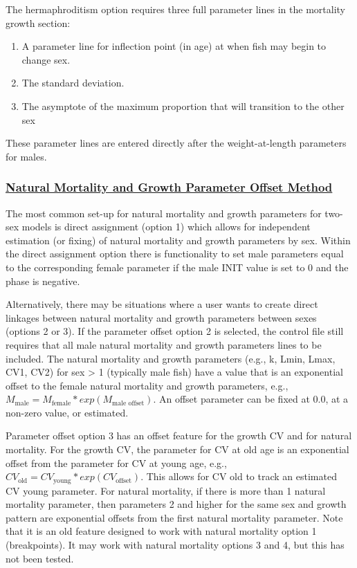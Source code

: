 The hermaphroditism option requires three full parameter lines in the mortality growth section: 
\begin{enumerate}
	\item A parameter line for inflection point (in age) at when fish may begin to change sex.
	\item The standard deviation.
	\item The asymptote of the maximum proportion that will transition to the other sex
\end{enumerate}
These parameter lines are entered directly after the weight-at-length parameters for males.

\hypertarget{offset}{}
\subsubsection[Natural Mortality and Growth Parameter Offset Method]{\protect\hyperlink{offset}{Natural Mortality and Growth Parameter Offset Method}}

The most common set-up for natural mortality and growth parameters for two-sex models is direct assignment (option 1) which allows for independent estimation (or fixing) of natural mortality and growth parameters by sex. Within the direct assignment option there is functionality to set male parameters equal to the corresponding female parameter if the male INIT value is set to 0 and the phase is negative. 

Alternatively, there may be situations where a user wants to create direct linkages between natural mortality and growth parameters between sexes (options 2 or 3). If the parameter offset option 2 is selected, the control file still requires that all male natural mortality and growth parameters lines to be included. The natural mortality and growth parameters (e.g., k, Lmin, Lmax, CV1, CV2) for sex > 1 (typically male fish) have a value that is an exponential offset to the female natural mortality and growth parameters, e.g., $M_{\text{male}} = M_{\text{female}}*exp(M_{\text{male offset}})$. An offset parameter can be fixed at 0.0, at a non-zero value, or estimated.

Parameter offset option 3 has an offset feature for the growth CV and for natural mortality. For the growth CV, the parameter for CV at old age is an exponential offset from the parameter for CV at young age, e.g., $CV_{\text{old}} = CV_{\text{young}}*exp(CV_{\text{offset}})$. This allows for CV old to track an estimated CV young parameter. For natural mortality, if there is more than 1 natural mortality parameter, then parameters 2 and higher for the same sex and growth pattern are exponential offsets from the first natural mortality parameter. Note that it is an old feature designed to work with natural mortality option 1 (breakpoints). It may work with natural mortality options 3 and 4, but this has not been tested.


